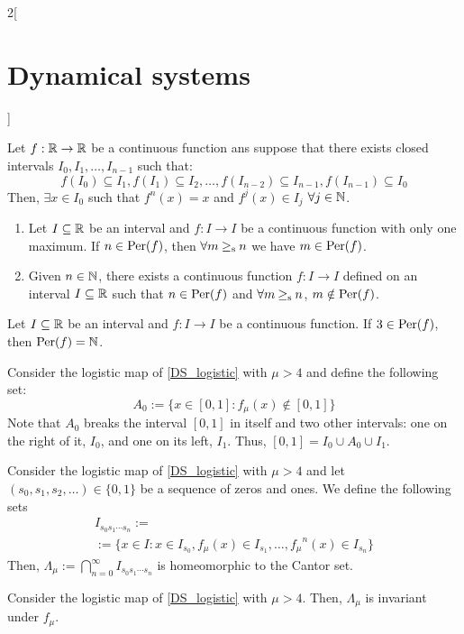 \documentclass[../../../main_math.tex]{subfiles}
\begin{document}
\begin{multicols}{2}[\section{Dynamical systems}]
\begin{proposition}
  \end{proposition}
  \begin{proposition}
    Let $f:\mathbb{R}\rightarrow \mathbb{R}$ be a continuous function ans suppose that there exists closed intervals $I_0,I_1,\ldots, I_{n-1}$ such that:
    $$f(I_0)\subseteq I_1,f(I_1)\subseteq I_2,\ldots, f(I_{n-2})\subseteq I_{n-1}, f(I_{n-1})\subseteq I_0$$
    Then, $\exists x\in I_0$ such that $f^n(x)=x$ and $f^j(x)\in I_j$ $\forall j\in\mathbb{N}$.
  \end{proposition}
  \begin{theorem}\hfill
    \begin{enumerate}
      \item Let $I\subseteq\mathbb{R}$ be an interval and $f:I\rightarrow I$ be a continuous function with only one maximum. If $n\in\operatorname{Per}(f)$, then $\forall m\mathbin{\geq_{\mathrm{s}}} n$ we have $m\in\operatorname{Per}(f)$.
      \item Given $n\in\mathbb{N}$, there exists a continuous function $f:I\rightarrow I$ defined on an interval $I\subseteq\mathbb{R}$ such that $n\in\operatorname{Per}(f)$ and $\forall m\mathbin{\geq_{\mathrm{s}}} n$, $m\notin\operatorname{Per}(f)$.
    \end{enumerate}
  \end{theorem}
  \begin{corollary}
    Let $I\subseteq\mathbb{R}$ be an interval and $f:I\rightarrow I$ be a continuous function. If $3\in \operatorname{Per}(f)$, then $\operatorname{Per}(f)=\mathbb{N}$.
  \end{corollary}
  \begin{definition}
    Consider the logistic map of \cref{DS_logistic} with $\mu >4$ and define the following set: $$A_0:=\{x\in [0,1]: f_\mu(x)\notin [0,1]\}$$ Note that $A_0$ breaks the interval $[0,1]$ in itself and two other intervals: one on the right of it, $I_0$, and one on its left, $I_1$. Thus, $[0,1]=I_0\cup A_0\cup I_1$.
  \end{definition}
  \begin{proposition}
    Consider the logistic map of \cref{DS_logistic} with $\mu >4$ and let $(s_0,s_1,s_2,\ldots)\in\{0,1\}$ be a sequence of zeros and ones. We define the following sets
    \begin{multline*}
      I_{s_0s_1\cdots s_n}:=\\:=\{x\in I: x\in I_{s_0}, f_\mu(x)\in I_{s_1},\ldots,{f_\mu}^n(x)\in I_{s_n}\}
    \end{multline*}
    Then, $\Lambda_\mu:=\bigcap_{n=0}^\infty I_{s_0s_1\cdots s_n}$ is homeomorphic to the Cantor set.
  \end{proposition}
  \begin{proposition}
    Consider the logistic map of \cref{DS_logistic} with $\mu >4$. Then, $\Lambda_\mu$ is invariant under $f_\mu$.
  \end{proposition}

\end{multicols}
\end{document}
